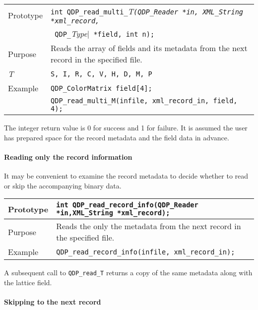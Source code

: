 \documentclass{article}
\newcommand{\allTypes}{{\tt S, I, R, C, V, H, D, M, P}}
\newcommand{\itt}{\it T}
\newcommand{\QMDhandle}{{\tt XML\_String}}
\begin{document}
\begin{flushleft}
  \begin{tabular}{|l|l|}
  \hline
  Prototype      & \verb|int QDP_read_multi_|\itt\verb|(QDP_Reader *in, |\QMDhandle\verb| *xml_record,|\\
                 & \verb| QDP_|{\it Type}|\verb| *field, int n);|\\
    \hline
  Purpose        & Reads the array of fields and its metadata from the next record in the specified file. \\
\hline
  \itt     & \allTypes \\
   \hline
  Example  & \verb|QDP_ColorMatrix field[4];| \\
           & \verb|QDP_read_multi_M(infile, xml_record_in, field, 4);| \\
   \hline
 \end{tabular}
\end{flushleft}
%
The integer return value is 0 for success and 1 for failure.  It is
assumed the user has prepared space for the record metadata and the
field data in advance.

\paragraph{Reading only the record information}

It may be convenient to examine the record metadata to decide whether
to read or skip the accompanying binary data.

\begin{flushleft}
  \begin{tabular}{|l|l|}
  \hline
  Prototype      & \verb|int QDP_read_record_info(QDP_Reader *in,|\QMDhandle \verb| *xml_record);|\\
    \hline
  Purpose        & Reads the only the metadata from the next record in the specified file. \\
   \hline
  Example  & \verb|QDP_read_record_info(infile, xml_record_in);| \\
   \hline
 \end{tabular}
\end{flushleft}
%
A subsequent call to \verb|QDP_read_T| returns a copy of the same
metadata along with the lattice field.

\paragraph{Skipping to the next record}
\end{document}
